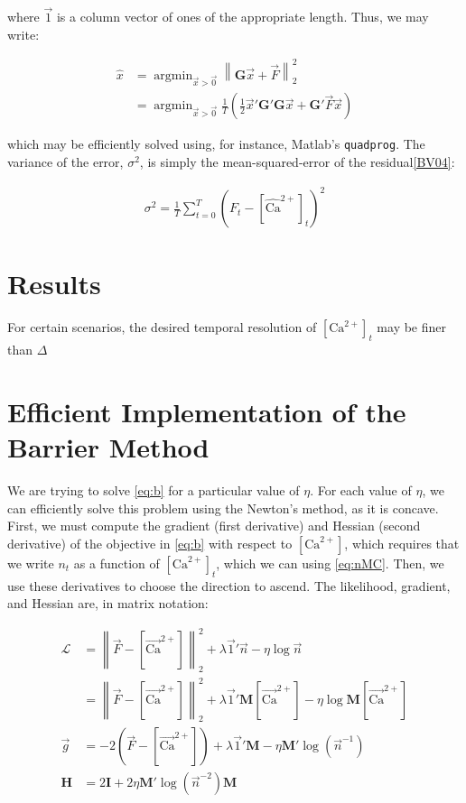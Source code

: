 \documentclass[12pt]{article}
\providecommand{\ve}[1]{\vec{#1}}
\providecommand{\ma}[1]{\boldsymbol{#1}}
\providecommand{\norm}[1]{\left \lVert#1 \right  \rVert}
\providecommand{\ve}[1]{\boldsymbol{#1}}
\DeclareMathOperator*{\argmin}{argmin}
\newcommand{\Lik}{\mathcal{L}}
\newcommand{\Ca}{[\text{Ca}^{2+}]}
\newcommand{\Cae}{[\widehat{\text{Ca}}^{2+}]}
\newcommand{\Cav}{[\ve{\text{Ca}}^{2+}]}
\begin{document}
\noindent where $\ve{1}$ is a column vector of ones of the appropriate length.  Thus, we may write:

\begin{align}
\widehat{x}&=\argmin_{\ve{x}>\ve{0}} \norm{\ma{G} \ve{x} + \ve{F}}_2^2\\
&=\argmin_{\ve{x}>\ve{0}} \frac{1}{T} (\frac{1}{2}\ve{x}' \ma{G}' \ma{G} \ve{x} + \ma{G}' \ve{F} \ve{x})
\end{align}

\noindent which may be efficiently solved using, for instance, Matlab's \texttt{quadprog}. The variance of the error, $\sigma^2$, is simply the mean-squared-error of the residual\ref{BV04}:

\begin{align}
\sigma^2 = \frac{1}{T} \sum_{t=0}^T (F_t - \Cae_t)^2
\end{align}

\section{Results} \label{sec:results}

For certain scenarios, the desired temporal resolution of $\Ca_t$ may be finer than $\Delta$

\appendix

\section{Efficient Implementation of the Barrier Method} \label{sec:bar}

We are trying to solve \eqref{eq:b} for a particular value of $\eta$.  For each value of $\eta$, we can efficiently solve this problem using the Newton's method, as it is concave. First, we must compute the gradient (first derivative) and Hessian (second derivative) of the objective in \eqref{eq:b} with respect to $\Ca$, which requires that we write $n_t$ as a function of $\Ca_t$, which we can using \eqref{eq:nMC}. Then, we use these derivatives to choose the direction to ascend. The likelihood, gradient, and Hessian are, in matrix notation:

\begin{align}
\Lik &= \norm{\ve{F}-\Cav}^2_2 + \lambda \ve{1}' \ve{n} - \eta \log \ve{n}\\
&= \norm{\ve{F}-\Cav}^2_2 + \lambda \ve{1}' \ma{M} \Cav - \eta \log \ma{M} \Cav\\
\ve{g} &= -2(\ve{F}-\Cav) +\lambda \ve{1}' \ma{M} - \eta \ma{M}' \log (\ve{n}^{-1}) \label{eq:g}\\
\ma{H} &= 2\ma{I} + 2 \eta \ma{M}' \log(\ve{n}^{-2}) \ma{M} \label{eq:H}
\end{align}
\end{document}
